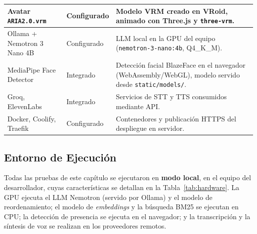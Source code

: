 \begin{table}[H]
\begin{tabular}{|>{\raggedright\arraybackslash}p{3.3cm}|>{\raggedright\arraybackslash}p{2.6cm}|>{\raggedright\arraybackslash}p{6.7cm}|}
    Avatar \texttt{ARIA2.0.vrm} & Configurado & Modelo VRM creado en VRoid, animado con Three.js y \texttt{three-vrm}. \\ \hline
    Ollama + Nemotron 3 Nano 4B & Configurado & LLM local en la GPU del equipo (\texttt{nemotron-\allowbreak{}3-\allowbreak{}nano:4b}, Q4\_K\_M). \\ \hline
    MediaPipe Face Detector & Integrado & Detección facial BlazeFace en el navegador (WebAssembly/WebGL), modelo servido desde \texttt{static/\allowbreak{}models/}. \\ \hline
    Groq, ElevenLabs & Integrado & Servicios de STT y TTS consumidos mediante API. \\ \hline
    Docker, Coolify, Traefik & Configurado & Contenedores y publicación HTTPS del despliegue en servidor. \\ \hline
  \end{tabular}
  \elaboradopor{\autorTFG}
\end{table}

\subsection{Entorno de Ejecución}
Todas las pruebas de este capítulo se ejecutaron en \textbf{modo local}, en el equipo del desarrollador, cuyas características se detallan en la Tabla~\ref{tab:hardware}. La GPU ejecuta el LLM Nemotron (servido por Ollama) y el modelo de reordenamiento; el modelo de \textit{embeddings} y la búsqueda BM25 se ejecutan en CPU; la detección de presencia se ejecuta en el navegador; y la transcripción y la síntesis de voz se realizan en los proveedores remotos.

